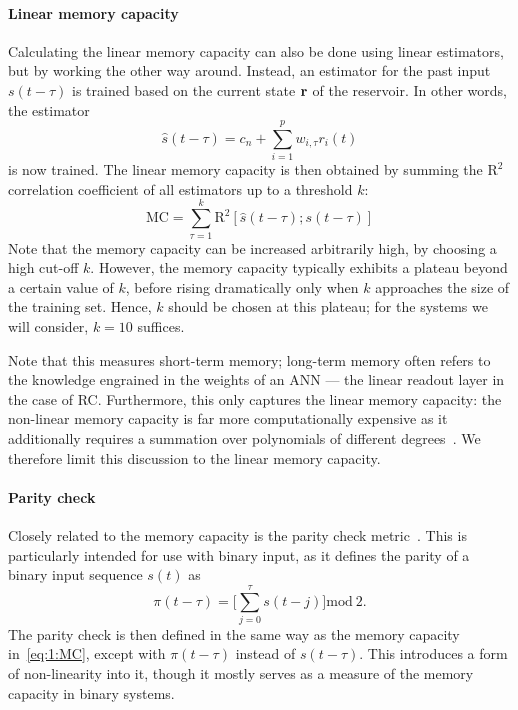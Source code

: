 \paragraph{Linear memory capacity}
Calculating the linear memory capacity can also be done using linear estimators, but by working the other way around.
Instead, an estimator for the past input $s(t - \tau)$ is trained based on the current state $\boldsymbol{\mathbf{r}}$ of the reservoir.
In other words, the estimator
\begin{equation}
	\hat{s}(t - \tau) = c_n + \sum_{i=1}^{p} w_{i,\tau} r_i(t)
\end{equation}
is now trained.
The linear memory capacity is then obtained by summing the $\mathrm{R}^2$ correlation coefficient of all estimators up to a threshold $k$:
\begin{equation}
	\label{eq:1:MC}
	\mathrm{MC} = \sum_{\tau = 1}^{k} \mathrm{R}^2[\hat{s}(t - \tau); s(t - \tau)]
\end{equation}
Note that the memory capacity can be increased arbitrarily high, by choosing a high cut-off $k$.
However, the memory capacity typically exhibits a plateau beyond a certain value of $k$, before rising dramatically only when $k$ approaches the size of the training set.
Hence, $k$ should be chosen at this plateau; for the systems we will consider, $k=10$ suffices. \par
Note that this measures short-term memory; long-term memory often refers to the knowledge engrained in the weights of an ANN --- the linear readout layer in the case of RC.
Furthermore, this only captures the linear memory capacity: the non-linear memory capacity is far more computationally expensive as it additionally requires a summation over polynomials of different degrees~\cite{RCbenchmarksReview1}.
We therefore limit this discussion to the linear memory capacity.

\paragraph{Parity check}
Closely related to the memory capacity is the parity check metric~\cite{hon2021numerical}.
This is particularly intended for use with binary input, as it defines the parity of a binary input sequence $s(t)$ as
\begin{equation}
	\pi(t-\tau) = \Bigg[\sum_{j = 0}^{\tau} s(t - j) \Bigg] \mathrm{mod}~2 \mathrm{.}
\end{equation}
The parity check is then defined in the same way as the memory capacity in~\cref{eq:1:MC}, except with $\pi(t - \tau)$ instead of $s(t - \tau)$.
This introduces a form of non-linearity into it, though it mostly serves as a measure of the memory capacity in binary systems. %



